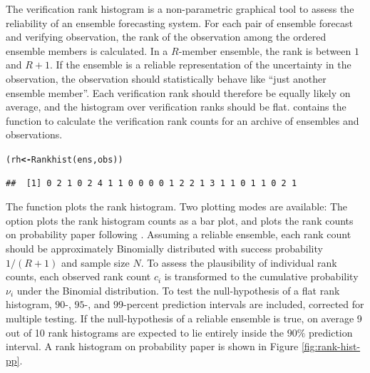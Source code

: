 \documentclass[article]{jss}\usepackage[]{graphicx}\usepackage[]{color}
\makeatletter
\newcommand{\hlstd}[1]{\textcolor[rgb]{0,0,0}{#1}}%
\newcommand{\hlkwb}[1]{\textcolor[rgb]{0.502,0.502,0.753}{\textbf{#1}}}%
\newcommand{\hlkwd}[1]{\textcolor[rgb]{0,0.267,0.4}{#1}}%
\newenvironment{kframe}{%
 \def\at@end@of@kframe{}%
 \ifinner\ifhmode%
  \def\at@end@of@kframe{\end{minipage}}%
  \begin{minipage}{\columnwidth}%
 \fi\fi%
 \def\FrameCommand##1{\hskip\@totalleftmargin \hskip-\fboxsep
 \colorbox{shadecolor}{##1}\hskip-\fboxsep
     \hskip-\linewidth \hskip-\@totalleftmargin \hskip\columnwidth}%
 \MakeFramed {\advance\hsize-\width
   \@totalleftmargin\z@ \linewidth\hsize
   \@setminipage}}%
 {\par\unskip\endMakeFramed%
 \at@end@of@kframe}
\newenvironment{knitrout}{}{} %
\makeatother
\begin{document}
The verification rank histogram \citep{hamill2001interpretation} is a non-parametric graphical tool to assess the reliability of an ensemble forecasting system.
For each pair of ensemble forecast and verifying observation, the rank of the observation among the ordered ensemble members is calculated.
In a $R$-member ensemble, the rank is between $1$ and $R+1$.
If the ensemble is a reliable representation of the uncertainty in the observation, the observation should statistically behave like ``just another ensemble member''. 
Each verification rank should therefore be equally likely on average, and the histogram over verification ranks should be flat. 
 contains the function  to calculate the verification rank counts for an archive of ensembles and observations.

\begin{knitrout}
\color{fgcolor}\begin{kframe}
\begin{alltt}
\hlstd{(rh} \hlkwb{<-} \hlkwd{Rankhist}\hlstd{(ens, obs))}
\end{alltt}
\begin{verbatim}
##  [1] 0 2 1 0 2 4 1 1 0 0 0 0 1 2 2 1 3 1 1 0 1 1 0 2 1
\end{verbatim}
\end{kframe}
\end{knitrout}



The function  plots the rank histogram.
Two plotting modes are available:
The option  plots the rank histogram counts as a bar plot, and  plots the rank counts on probability paper following \citet{broecker2008reliability}. 
Assuming a reliable ensemble, each rank count should be approximately Binomially distributed with success probability $1/(R+1)$ and sample size $N$.
To assess the plausibility of individual rank counts, each observed rank count $c_i$ is transformed to the cumulative probability $\nu_i$ under the Binomial distribution.
To test the null-hypothesis of a flat rank histogram, $90$-, $95$-, and $99$-percent prediction intervals are included, corrected for multiple testing.
If the null-hypothesis of a reliable ensemble is true, on average 9 out of 10 rank histograms are expected to lie entirely inside the $90\%$ prediction interval.
A rank histogram on probability paper is shown in Figure \ref{fig:rank-hist-pp}. 
\end{document}
